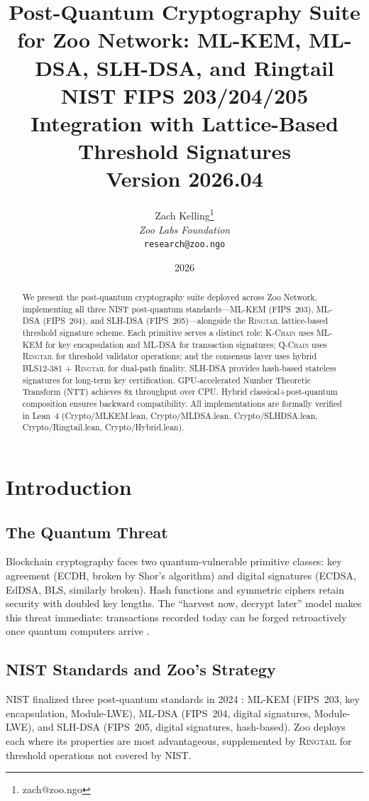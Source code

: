 \documentclass[11pt,letterpaper]{article}
\title{\textbf{Post-Quantum Cryptography Suite for Zoo Network: ML-KEM, ML-DSA, SLH-DSA, and Ringtail}\\
\large NIST FIPS 203/204/205 Integration with Lattice-Based Threshold Signatures\\
\vspace{5pt}
\normalsize Version 2026.04}
\author{
Zach Kelling\thanks{zach@zoo.ngo}\\
\textit{Zoo Labs Foundation}\\
\texttt{research@zoo.ngo}
}
\date{2026}
\theoremstyle{definition}
\theoremstyle{remark}
\newcommand{\Ringtail}{\textsc{Ringtail}}
\newcommand{\MLKEM}{\textsc{ML-KEM}}
\newcommand{\MLDSA}{\textsc{ML-DSA}}
\newcommand{\SLHDSA}{\textsc{SLH-DSA}}
\newcommand{\KChain}{\textsc{K-Chain}}
\newcommand{\QChain}{\textsc{Q-Chain}}
\begin{document}
\zoocoverpage

\begin{abstract}
We present the post-quantum cryptography suite deployed across Zoo Network, implementing all three NIST post-quantum standards---\MLKEM{} (FIPS~203), \MLDSA{} (FIPS~204), and \SLHDSA{} (FIPS~205)---alongside the \Ringtail{} lattice-based threshold signature scheme. Each primitive serves a distinct role: \KChain{} uses \MLKEM{} for key encapsulation and \MLDSA{} for transaction signatures; \QChain{} uses \Ringtail{} for threshold validator operations; and the consensus layer uses hybrid BLS12-381 + \Ringtail{} for dual-path finality. \SLHDSA{} provides hash-based stateless signatures for long-term key certification. GPU-accelerated Number Theoretic Transform (NTT) achieves 8x throughput over CPU. Hybrid classical+post-quantum composition ensures backward compatibility. All implementations are formally verified in Lean~4 (Crypto/MLKEM.lean, Crypto/MLDSA.lean, Crypto/SLHDSA.lean, Crypto/Ringtail.lean, Crypto/Hybrid.lean).
\end{abstract}

\tableofcontents
\newpage

\section{Introduction}

\subsection{The Quantum Threat}

Blockchain cryptography faces two quantum-vulnerable primitive classes: key agreement (ECDH, broken by Shor's algorithm) and digital signatures (ECDSA, EdDSA, BLS, similarly broken). Hash functions and symmetric ciphers retain security with doubled key lengths. The ``harvest now, decrypt later'' model makes this threat immediate: transactions recorded today can be forged retroactively once quantum computers arrive \cite{shor1997polynomial}.

\subsection{NIST Standards and Zoo's Strategy}

NIST finalized three post-quantum standards in 2024 \cite{nist2024pqc}: \MLKEM{} (FIPS~203, key encapsulation, Module-LWE), \MLDSA{} (FIPS~204, digital signatures, Module-LWE), and \SLHDSA{} (FIPS~205, digital signatures, hash-based). Zoo deploys each where its properties are most advantageous, supplemented by \Ringtail{} for threshold operations not covered by NIST.
\end{document}
